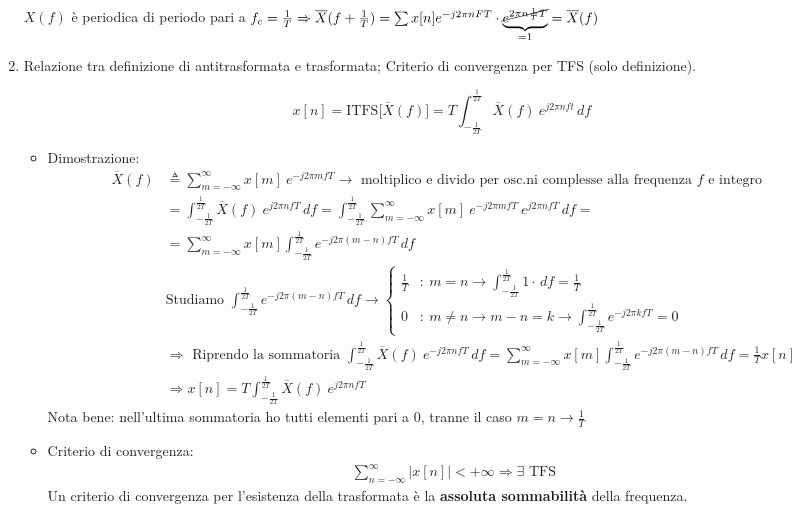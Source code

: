 \documentclass[
]{article}
\providecommand{\tightlist}{%
  \setlength{\itemsep}{0pt}\setlength{\parskip}{0pt}}
\begin{document}
\begin{enumerate}
  \(X(f)\) è periodica di periodo pari a
  \(f_c =\frac{1}{T} \Rightarrow \overline{X}(f+\frac{1}{T})= \sum x[n]e^{-j2\pi nFT} \cdot \underbrace{\cancel{e^{2\pi n \frac{1}{T}T}}}_{=1}=\overline{X}(f)\)
\item
  Relazione tra definizione di antitrasformata e trasformata; Criterio
  di convergenza per TFS (solo definizione).

  \[
   x[n] = \text{ITFS}\Big [ \overline{X}(f) \Big] = T \int_{-\frac{1}{2T}}^{\frac{1}{2T}} \overline{X}(f) \ e^{j2\pi n ft} \,df
   \]

  \begin{itemize}
  \tightlist
  \item
    Dimostrazione: \begin{align*}
     \overline{X}(f) &\triangleq \sum_{m=-\infty}^{\infty} x[m] \ e^{-j2\pi m fT} \to \text{ moltiplico e divido per osc.ni complesse alla frequenza } f \text{ e integro}\\
     & =\int_{-\frac{1}{2T}}^{\frac{1}{2T}} \overline{X}(f) \ e^{j2\pi n fT} \,df = \int_{-\frac{1}{2T}}^{\frac{1}{2T}} \sum_{m=-\infty}^{\infty} x[m] \ e^{-j2\pi m fT} \ e^{j2\pi n fT} \,df = \\
     & =\sum_{m=-\infty}^{\infty} x[m] \int_{-\frac{1}{2T}}^{\frac{1}{2T}} e^{-j2\pi (m-n)fT}\,df \\
     &\text{Studiamo } \int_{-\frac{1}{2T}}^{\frac{1}{2T}} e^{-j2\pi (m-n)fT}\,df \longrightarrow
     \left\{ \begin{array}{cl}
     \frac{1}{T} & : \ m=n \to \int_{-\frac{1}{2T}}^{\frac{1}{2T}} 1\cdot \,df = \frac{1}{T} \\
     0 & : \ m \neq n \to m-n=k \to \int_{-\frac{1}{2T}}^{\frac{1}{2T}} e^{-j2\pi kfT} = 0
     \end{array} \right. \\    
     &\Rightarrow \text{ Riprendo la sommatoria } \int_{-\frac{1}{2T}}^{\frac{1}{2T}} \overline{X}(f) \ e^{-j2\pi nfT} \,df = \sum_{m=-\infty}^{\infty}
     x[m] \int_{-\frac{1}{2T}}^{\frac{1}{2T}} e^{-j2\pi(m-n)fT}\,df = \frac{1}{T}x[n] \\
     & \Rightarrow x[n] = T \int_{-\frac{1}{2T}}^{\frac{1}{2T}}\overline{X}(f)\ e^{j2\pi nfT}
     \end{align*} Nota bene: nell'ultima sommatoria ho tutti elementi
    pari a \(0\), tranne il caso \(m=n \to \frac{1}{T}\)
  \item
    Criterio di convergenza: \begin{gather*}
     \sum_{n=-\infty}^{\infty} \Big|x[n]\Big| < +\infty \Rightarrow \exists \text{ TFS}
     \end{gather*} Un criterio di convergenza per l'esistenza della
    trasformata è la \textbf{assoluta sommabilità} della frequenza.
  \end{itemize}
\end{enumerate}
\end{document}
